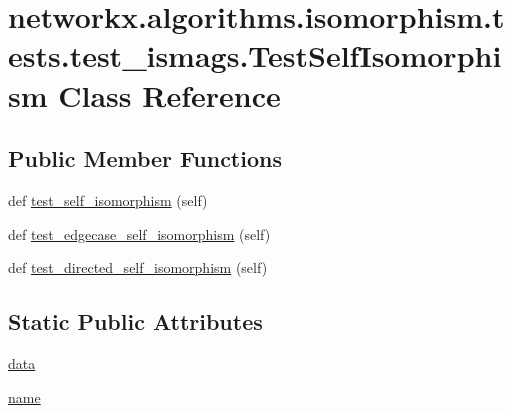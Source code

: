 \hypertarget{classnetworkx_1_1algorithms_1_1isomorphism_1_1tests_1_1test__ismags_1_1TestSelfIsomorphism}{}\section{networkx.\+algorithms.\+isomorphism.\+tests.\+test\+\_\+ismags.\+Test\+Self\+Isomorphism Class Reference}
\label{classnetworkx_1_1algorithms_1_1isomorphism_1_1tests_1_1test__ismags_1_1TestSelfIsomorphism}
\subsection*{Public Member Functions}
\begin{DoxyCompactItemize}
\item 
def \hyperlink{classnetworkx_1_1algorithms_1_1isomorphism_1_1tests_1_1test__ismags_1_1TestSelfIsomorphism_a4659be802495814b06ff4e5878fe548a}{test\+\_\+self\+\_\+isomorphism} (self)
\item 
def \hyperlink{classnetworkx_1_1algorithms_1_1isomorphism_1_1tests_1_1test__ismags_1_1TestSelfIsomorphism_a8c4c13def83c96ef698bdec7c89d41a1}{test\+\_\+edgecase\+\_\+self\+\_\+isomorphism} (self)
\item 
def \hyperlink{classnetworkx_1_1algorithms_1_1isomorphism_1_1tests_1_1test__ismags_1_1TestSelfIsomorphism_a4bfb6cfd6378a60c470d52f465f9fad4}{test\+\_\+directed\+\_\+self\+\_\+isomorphism} (self)
\end{DoxyCompactItemize}
\subsection*{Static Public Attributes}
\begin{DoxyCompactItemize}
\item 
\hyperlink{classnetworkx_1_1algorithms_1_1isomorphism_1_1tests_1_1test__ismags_1_1TestSelfIsomorphism_ad8d31d407ee33893139b010b3ae37789}{data}
\item 
\hyperlink{classnetworkx_1_1algorithms_1_1isomorphism_1_1tests_1_1test__ismags_1_1TestSelfIsomorphism_adb8e75a1b2e33e1664a0eabf1a751b8f}{name}
\end{DoxyCompactItemize}


